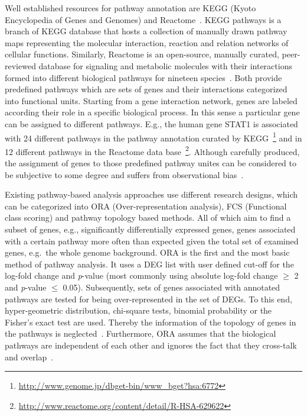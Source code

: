 \documentclass[10pt,a4paper,twocolumn]{article}
\newcommand{\ILH}[1]{\begingroup\color{blue}#1\endgroup}
\begin{document}
Well established resources for pathway annotation are KEGG (Kyoto
Encyclopedia of Genes and Genomes)\cite{Kegg} and
Reactome~\cite{Reactome}. KEGG pathways is a branch of KEGG database that
hosts a collection of manually drawn pathway maps representing the
molecular interaction, reaction and relation networks of cellular
functions. Similarly, Reactome is an open-source, manually curated,
peer-reviewed database for signaling and metabolic molecules with their
interactions formed into different biological pathways for nineteen
species~\cite{Reactome}. Both provide predefined pathways which are sets of
genes and their interactions categorized into functional units. Starting
from a gene interaction network, genes are labeled according their role in
a specific biological process. In this sense a particular gene can be
assigned to different pathways. E.g., the human gene STAT1 is associated
with 24 different pathways in the pathway annotation curated by
KEGG~\footnote{\url{http://www.genome.jp/dbget-bin/www_bget?hsa:6772}} and
in 12 different pathways in the Reactome data
base~\footnote{\url{http://www.reactome.org/content/detail/R-HSA-629622}}.
Although carefully produced, the assignment of genes to those predefined
pathway unites can be considered to be subjective to some degree and
suffers from observational bias~\cite{schnoes2013biases}.

Existing pathway-based analysis approaches use different research
designs, which can be categorized into ORA (Over-representation
analysis), FCS (Functional class scoring) and pathway topology based
methods. All of which aim to find a subset of genes, e.g.,
significantly differentially expressed genes, genes associated with a
certain pathway more often than expected given the total set of
examined genes, e.g.~the whole genome background.  \ILH{ORA \cite{} is
  the first and the most basic method of pathway analysis.} It uses a
DEG list with user defined cut-off for the log-fold change and
\textit{p}-value (most commonly using absolute log-fold change $\geq$
2 and \textit{p}-value $\leq$ 0.05). Subsequently, sets of genes
associated with annotated pathways are tested for being
over-represented in the set of DEGs. To this end, hyper-geometric
distribution, chi-square tests, binomial probability or the Fisher’s
exact test are used. Thereby the information of the topology of genes
in the pathways is neglected~\cite{Bayer}. Furthermore, ORA assumes
that the biological pathways are independent of each other and ignores
the fact that they cross-talk and overlap~\cite{Khatri2012,Campos}.
\end{document}
